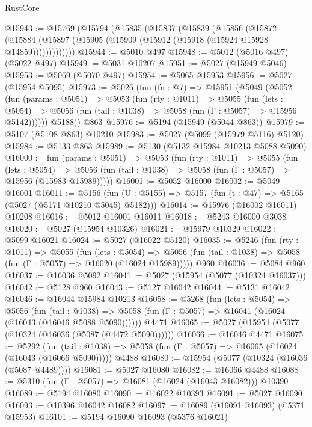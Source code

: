 \begin{lexlean}{RustCore}
\begin{coremodule}
@15943 := @15769
    (@15794
      (@15835
        (@15837
          (@15839
            (@15856
              (@15872
                (@15884 (@15897 (@15905 (@15909 (@15912 (@15918 (@15924 @15928 @14859)))))))))))))
@15944 := @5010 @497
@15948 := @5012 (@5016 @497) (@5022 @497)
@15949 := @5031 @10207
@15951 := @5027 (@15949 @5046)
@15953 := @5069 (@5070 @497)
@15954 := @5065 @15953
@15956 := @5027 (@15954 @5095)
@15973 := @5026
    (fun (fn : @7) =>
    @15951
      (@5049
        (@5052
          (fun (params : @5051) =>
          @5053
            (fun (rty : @1011) =>
            @5055
              (fun (lets : @5054) =>
              @5056 (fun (tail : @1038) => @5058 (fun (Γ : @5057) => @15956 @5142))))))
        @5188))
    @863
@15976 := @5194 (@15949 (@5044 @863))
@15979 := @5107 (@5108 @863) @10210
@15983 := @5027 (@5099 (@15979 @5116) @5120)
@15984 := @5133 @863
@15989 := @5130 (@5132 @15984 @10213 @5088 @5090)
@16000 := fun (params : @5051) =>
  @5053
    (fun (rty : @1011) =>
    @5055
      (fun (lets : @5054) =>
      @5056 (fun (tail : @1038) => @5058 (fun (Γ : @5057) => @15956 (@15983 @15989)))))
@16001 := @5052 @16000
@16002 := @5049 @16001
@16011 := @5156
    (fun (U : @5155) => @5157 (fun (t : @47) => @5165 (@5027 (@5171 @10210 @5045) @5182)))
@16014 := @15976 (@16002 @16011) @10208
@16016 := @5012 @16001 @16011
@16018 := @5243 @16000 @3038
@16020 := @5027 (@15954 @10326)
@16021 := @15979 @10329
@16022 := @5099 @16021
@16024 := @5027 (@16022 @5120)
@16035 := @5246
    (fun (rty : @1011) =>
    @5055
      (fun (lets : @5054) =>
      @5056 (fun (tail : @1038) => @5058 (fun (Γ : @5057) => @16020 (@16024 @15989)))))
    @960
@16036 := @5084 @960
@16037 := @16036 @5092
@16041 := @5027 (@15954 (@5077 (@10324 @16037)))
@16042 := @5128 @960
@16043 := @5127 @16042
@16044 := @5131 @16042
@16046 := @16044 @15984 @10213
@16058 := @5268
    (fun (lets : @5054) =>
    @5056
      (fun (tail : @1038) =>
      @5058 (fun (Γ : @5057) => @16041 (@16024 (@16043 (@16046 @5088 @5090))))))
    @4471
@16065 := @5027 (@15954 (@5077 (@10324 (@16036 (@5087 (@4472 @5090))))))
@16066 := @16046 @4471
@16075 := @5292
    (fun (tail : @1038) => @5058 (fun (Γ : @5057) => @16065 (@16024 (@16043 (@16066 @5090)))))
    @4488
@16080 := @15954 (@5077 (@10324 (@16036 (@5087 @4489))))
@16081 := @5027 @16080
@16082 := @16066 @4488
@16088 := @5310 (fun (Γ : @5057) => @16081 (@16024 (@16043 @16082))) @10390
@16089 := @5194 @16080
@16090 := @16022 @10393
@16091 := @5027 @16090
@16093 := @10396 @16042 @16082
@16097 := @16089 (@16091 @16093) (@5371 @15953)
@16101 := @5194 @16090 @16093 (@5376 @16021)

\end{coremodule}
\end{lexlean}
